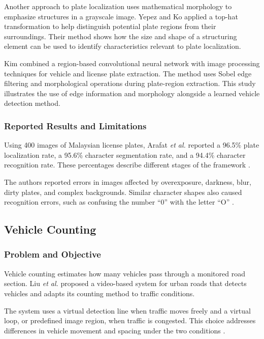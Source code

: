 \documentclass[conference]{IEEEtran}
\begin{document}
	Another approach to plate localization uses mathematical morphology to
	emphasize structures in a grayscale image. Yepez and Ko
	\cite{yepez2018} applied a top-hat transformation to help distinguish
	potential plate regions from their surroundings. Their method shows how
	the size and shape of a structuring element can be used to identify
	characteristics relevant to plate localization.
	
	Kim \cite{kim2019} combined a region-based convolutional neural network
	with image processing techniques for vehicle and license plate
	extraction. The method uses Sobel edge filtering and morphological
	operations during plate-region extraction. This study illustrates the
	use of edge information and morphology alongside a learned vehicle
	detection method.
	
	\subsubsection{Reported Results and Limitations}
	
	Using 400 images of Malaysian license plates, Arafat \textit{et al.}
	reported a 96.5\% plate localization rate, a 95.6\% character
	segmentation rate, and a 94.4\% character recognition rate. These
	percentages describe different stages of the framework
	\cite{arafat2020}.
	
	The authors reported errors in images affected by overexposure,
	darkness, blur, dirty plates, and complex backgrounds. Similar
	character shapes also caused recognition errors, such as confusing the
	number ``0'' with the letter ``O'' \cite{arafat2020}.
	
	
	\subsection{Vehicle Counting}
	
	\subsubsection{Problem and Objective}
	
	Vehicle counting estimates how many vehicles pass through a monitored
	road section. Liu \textit{et al.} \cite{liu2017} proposed a video-based
	system for urban roads that detects vehicles and adapts its counting
	method to traffic conditions.
	
	The system uses a virtual detection line when traffic moves freely and
	a virtual loop, or predefined image region, when traffic is congested.
	This choice addresses differences in vehicle movement and spacing under
	the two conditions \cite{liu2017}.
	
\end{document}
